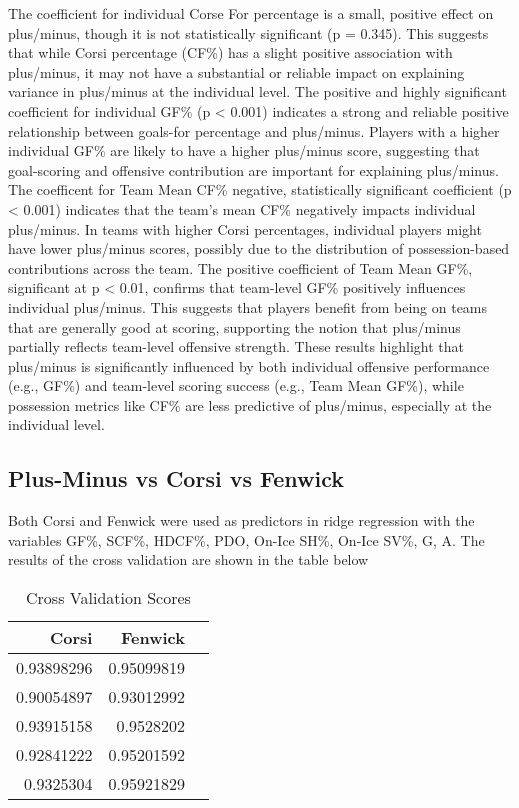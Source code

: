 \documentclass[12pt]{article}
\begin{document}
The coefficient for individual Corse For percentage is a small, positive effect on plus/minus, though it is not statistically significant 
(p = 0.345). This suggests that while Corsi percentage (CF\%) has a slight positive association with plus/minus, it may not have a 
substantial or reliable impact on explaining variance in plus/minus at the individual level. The positive and highly significant 
coefficient for individual GF\% (p < 0.001) indicates a strong and reliable positive relationship between goals-for percentage and plus/minus. 
Players with a higher individual GF\% are likely to have a higher plus/minus score, suggesting that goal-scoring and offensive contribution 
are important for explaining plus/minus. The coefficent for Team Mean CF\% negative, statistically significant coefficient (p < 0.001) 
indicates that the team’s mean CF\% negatively impacts individual plus/minus. In teams with higher Corsi percentages, individual players 
might have lower plus/minus scores, possibly due to the distribution of possession-based contributions across the team. The positive 
coefficient of Team Mean GF\%, significant at p < 0.01, confirms that team-level GF\% positively influences individual plus/minus. This 
suggests that players benefit from being on teams that are generally good at scoring, supporting the notion that plus/minus partially 
reflects team-level offensive strength. These results highlight that plus/minus is significantly influenced by both individual offensive 
performance (e.g., GF\%) and team-level scoring success (e.g., Team Mean GF\%), while possession metrics like CF\% are less predictive of 
plus/minus, especially at the individual level.


\subsection{Plus-Minus vs Corsi vs Fenwick}

Both Corsi and Fenwick were used as predictors in ridge regression with the variables GF\%, SCF\%, HDCF\%, PDO, On-Ice SH\%, On-Ice SV\%, G, A.
The results of the cross validation are shown in the table below

\begin{table}[tbp]
  \caption{Cross Validation Scores}
  \label{tab:rv}
\centering
\begin{tabular}{rrr}
  \toprule
Corsi & Fenwick \\ 
  \midrule
  0.93898296 & 0.95099819 \\ 
  0.90054897 & 0.93012992 \\ 
  0.93915158 & 0.9528202 \\ 
  0.92841222 & 0.95201592 \\ 
  0.9325304 & 0.95921829 \\ 
   \bottomrule
\end{tabular}
\end{table}
\end{document}

